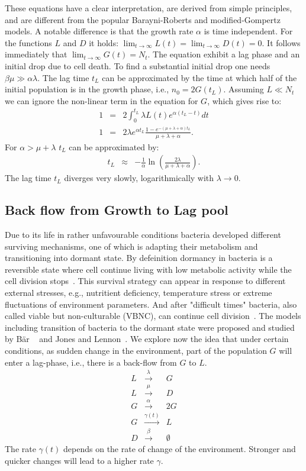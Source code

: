\documentclass[10pt,A4paper]{article}
\begin{document}
These equations have a clear interpretation, are derived from simple principles, and are different from the popular Barayni-Roberts and modified-Gompertz models. 
A notable difference is that the growth rate $\alpha$ is time independent. 
For the functions $L$ and $D$ it holds: $\lim_{t\to\infty} L(t) = \lim_{t\to\infty} D(t) = 0$. 
It follows immediately that $\lim_{t\to\infty} G(t) = N_t$. 
The equation exhibit a lag phase and an initial drop due to cell death. 
To find a substantial initial drop one needs $\beta \mu \gg \alpha \lambda$. 
The lag time $t_L$ can be approximated by the time at which half of the initial population is in the growth phase, i.e., $n_0=2G(t_L)$. 
Assuming $L\ll N_t$ we can ignore the non-linear term in the equation for $G$, which gives rise to:
\begin{eqnarray}
1&=& 2\int_0^{t_L} \lambda L(t)e^{\alpha(t_L-t)}dt\\
1  &=& 2\lambda e^{\alpha t_L}\frac{1-e^{-(\mu+\lambda+\alpha)t_L}}{\mu+\lambda+\alpha}.
\end{eqnarray}
For $\alpha > \mu+\lambda$ $t_L$ can be approximated by:
\begin{eqnarray}
t_L &\approx& -\frac{1}{\alpha}\ln\left(\frac{2\lambda}{\mu+\lambda+\alpha}\right).
\end{eqnarray}
The lag time $t_L$ diverges very slowly, logarithmically with $\lambda\to 0$.
%
%
\subsection{Back flow from Growth to Lag pool}
Due to its life in rather unfavourable conditions bacteria developed different surviving mechanisms, one of which is adapting their metabolism and transitioning into dormant state.
By defeinition dormancy in bacteria is a reversible state where cell continue living with low metabolic activity while the cell division stops~\cite{kaprelyants_dormancy_1993}. 
This survival strategy can appear in response to different external stresses, e.g., nutritient deficiency, temperature stress or extreme fluctuations of environment parameters.
And after "difficult times" bacteria, also called viable but non-culturable (VBNC), can continue cell division~\cite{kell_viability_1998}.
The models including transition of bacteria to the dormant state were proposed and studied by Bär \etal~\cite{bar_modelling_2002} and Jones and Lennon~\cite{jones_dormancy_2010}.
%
%
We explore now the idea that under certain conditions, as sudden change in the environment, part of the population $G$ will enter a lag-phase, i.e., there is a back-flow from $G$ to $L$. 
\begin{eqnarray}
    L &\stackrel{\lambda}{\longrightarrow} & G\\
    L &\stackrel{\mu}{\longrightarrow} & D\\
    G &\stackrel{\alpha}{\longrightarrow} & 2G\\
    G &\stackrel{\gamma(t)}{\longrightarrow} & L\\
    D &\stackrel{\beta}{\longrightarrow} & \emptyset
\end{eqnarray}
The rate $\gamma(t)$ depends on the rate of change of the environment.
Stronger and quicker changes will lead to a higher rate $\gamma$. 
%
%
\end{document}
